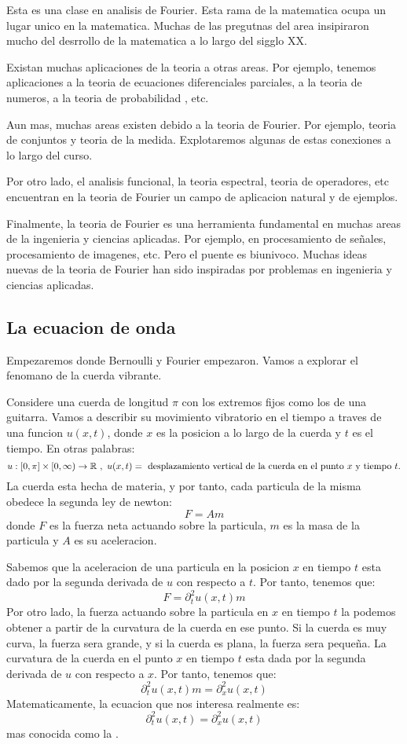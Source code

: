 
Esta es una clase en analisis de Fourier. Esta rama de la matematica ocupa un lugar unico en la matematica. Muchas de las pregutnas del area insipiraron mucho del desrrollo de la matematica a lo largo del sigglo XX.

Existan muchas aplicaciones de la teoria a otras areas. Por ejemplo, tenemos aplicaciones a la teoria de ecuaciones diferenciales parciales, a la teoria de numeros, a la teoria de probabilidad , etc.

Aun mas, muchas areas existen debido a la teoria de Fourier. Por ejemplo, teoria de conjuntos y teoria de la medida. Explotaremos algunas de estas conexiones a lo largo del curso.

Por otro lado, el analisis funcional, la teoria espectral, teoria de operadores, etc encuentran en la teoria de Fourier un campo de aplicacion natural y de ejemplos.

Finalmente, la teoria de Fourier es una herramienta fundamental en muchas areas de la ingenieria y ciencias aplicadas. Por ejemplo, en procesamiento de señales, procesamiento de imagenes, etc. Pero el puente es biunivoco. Muchas ideas nuevas de la teoria de Fourier han sido inspiradas por problemas en ingenieria y ciencias aplicadas. 

\subsection{La ecuacion de onda}

Empezaremos donde Bernoulli y Fourier empezaron. Vamos a explorar el fenomano de la cuerda vibrante.

Considere una cuerda de longitud $\pi$ con los extremos fijos como los de una guitarra. Vamos a describir su movimiento vibratorio en el tiempo a traves de una funcion $u(x,t)$, donde $x$ es la posicion a lo largo de la cuerda y $t$ es el tiempo. En otras palabras:
\[
   u: [0,\pi] \times [0,\infty) \to \mathbb R \ , \ u(x,t) = \text{ desplazamiento vertical de la cuerda en el punto } x \text{ y tiempo } t.
\]
La cuerda esta hecha de materia, y por tanto, cada particula de la misma obedece la segunda ley de newton:
\[
   F= A m
\]
donde $F$ es la fuerza neta actuando sobre la particula, $m$ es la masa de la particula y $A$ es su aceleracion.

Sabemos que la aceleracion de una particula en la posicion $x$ en tiempo $t$ esta dado por la segunda derivada de $u$ con respecto a $t$. Por tanto, tenemos que:
\[
   F = \partial^2_t u(x,t) m
\]
Por otro lado, la fuerza actuando sobre la particula en $x$ en tiempo $t$ la podemos obtener a partir de la curvatura de la cuerda en ese punto. Si la cuerda es muy curva, la fuerza sera grande, y si la cuerda es plana, la fuerza sera pequeña. La curvatura de la cuerda en el punto $x$ en tiempo $t$ esta dada por la segunda derivada de $u$ con respecto a $x$. Por tanto, tenemos que:
\[
   \partial^2_t u(x,t) m = \partial^2_x u(x,t)
\]
Matematicamente, la ecuacion que nos interesa realmente es:
\[
   \partial^2_t u(x,t) =  \partial^2_x u(x,t)
\]
mas conocida como la .

